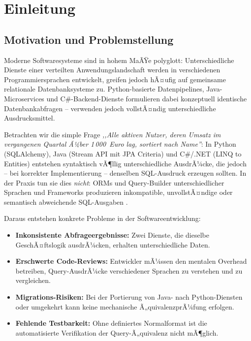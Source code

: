 ﻿%
\section{Einleitung}
\label{sec:einleitung}

\subsection{Motivation und Problemstellung}
\label{subsec:motivation}

Moderne Softwaresysteme sind in hohem MaÃŸe polyglott: Unterschiedliche Dienste
einer verteilten Anwendungslandschaft werden in verschiedenen Programmiersprachen
entwickelt, greifen jedoch hÃ¤ufig auf gemeinsame relationale Datenbanksysteme zu.
Python-basierte Datenpipelines, Java-Microservices und C\#-Backend-Dienste
formulieren dabei konzeptuell identische Datenbankabfragen -- verwenden jedoch
vollstÃ¤ndig unterschiedliche Ausdrucksmittel.

Betrachten wir die simple Frage \emph{,,Alle aktiven Nutzer, deren Umsatz im
vergangenen Quartal Ã¼ber 1\,000~Euro lag, sortiert nach Name''}: In Python
(SQLAlchemy), Java (Stream API mit JPA Criteria) und C\#/.NET (LINQ to Entities)
entstehen syntaktisch vÃ¶llig unterschiedliche AusdrÃ¼cke, die jedoch -- bei
korrekter Implementierung -- denselben SQL-Ausdruck erzeugen sollten. In der
Praxis tun sie dies \emph{nicht}: ORMs und Query-Builder unterschiedlicher
Sprachen und Frameworks produzieren inkompatible, unvollstÃ¤ndige oder semantisch
abweichende SQL-Ausgaben \cite{ansi_sql_2016,hibernate_docs,ef_core_docs}.

Daraus entstehen konkrete Probleme in der Softwareentwicklung:

\begin{itemize}[leftmargin=1.5cm]
  \item \textbf{Inkonsistente Abfrageergebnisse:} Zwei Dienste, die dieselbe
    GeschÃ¤ftslogik ausdrÃ¼cken, erhalten unterschiedliche Daten.
  \item \textbf{Erschwerte Code-Reviews:} Entwickler mÃ¼ssen den mentalen Overhead
    betreiben, Query-AusdrÃ¼cke verschiedener Sprachen zu verstehen und zu vergleichen.
  \item \textbf{Migrations-Risiken:} Bei der Portierung von Java- nach Python-Diensten
    oder umgekehrt kann keine mechanische Ã„quivalenzprÃ¼fung erfolgen.
  \item \textbf{Fehlende Testbarkeit:} Ohne definiertes Normalformat ist die
    automatisierte Verifikation der Query-Ã„quivalenz nicht mÃ¶glich.
\end{itemize}

